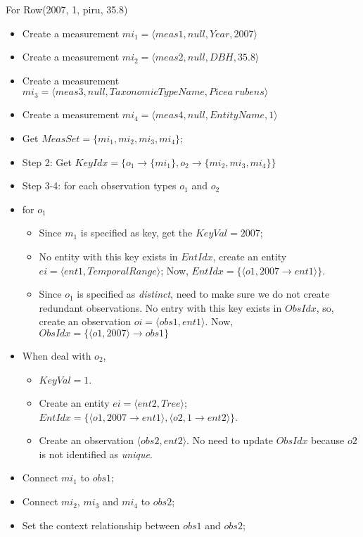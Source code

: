 \documentclass[10pt]{article}
\begin{document}
For Row(2007, 1, piru, 35.8)
    \begin{itemize}
    \item Create a measurement $mi_1=\langle meas1, null, Year, 2007\rangle$
    \item Create a measurement $mi_2=\langle meas2, null, DBH, 35.8\rangle$
    \item Create a measurement $mi_3=\langle meas3, null, TaxonomicTypeName, Picea~rubens\rangle$
    \item Create a measurement $mi_4=\langle meas4, null, EntityName, 1\rangle$
    \item Get $MeasSet = \{mi_1, mi_2, mi_3, mi_4\}$;
    \item Step 2: Get $KeyIdx = \{o_1\rightarrow \{mi_1\}, o_2 \rightarrow \{mi_2, mi_3, mi_4\}\}$
    \item Step 3-4: for each observation types $o_1$ and $o_2$
    \item for $o_1$
    \begin{itemize}
        \item Since $m_1$ is specified as key, get the $KeyVal=2007$;
        \item No entity with this key exists in $EntIdx$, create an entity $ei=\langle ent1, TemporalRange\rangle$; Now, $EntIdx=\{\langle o1, 2007\rightarrow ent1\rangle\}$.
        \item Since $o_1$ is specified as {\em distinct}, need to make sure we do not create redundant observations. No entry with this key exists in $ObsIdx$, so, create an observation
        $oi = \langle obs1, ent1\rangle$. Now, $ObsIdx=\{\langle o1, 2007 \rangle \rightarrow obs1\}$
    \end{itemize}
    \item When deal with $o_2$,
        \begin{itemize}
        \item $KeyVal=1$.
        \item Create an entity $ei=\langle ent2, Tree\rangle$; $EntIdx=\{\langle o1, 2007\rightarrow ent1\rangle, \langle o2, 1\rightarrow ent2\rangle\}$.
        \item Create an observation $\langle obs2, ent2 \rangle$. No need to update $ObsIdx$ because $o2$ is not identified as {\em unique}.
        \end{itemize}
    \item Connect $mi_1$ to $obs1$;
    \item Connect $mi_2$, $mi_3$ and $mi_4$ to $obs2$;
    \item Set the context relationship between $obs1$ and $obs2$;
    \end{itemize}
\end{document}

